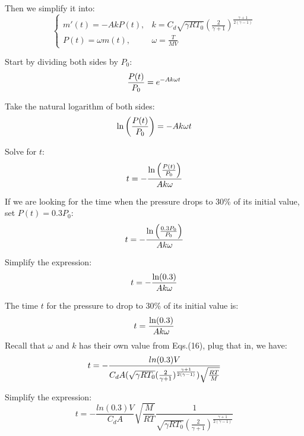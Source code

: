 Then we simplify it into:
\begin{equation}
\left\{
\begin{array}{ll}
m'(t) = -AkP(t), & \text{$k = C_d\sqrt{\gamma R T_0}\left( \frac{2}{\gamma + 1} \right)^{\frac{\gamma + 1}{2(\gamma - 1)}}$} \\
    P(t)=\omega m(t), & \text{$\omega=\frac{T}{MV}$}
\end{array}
\right.
\end{equation}

Start by dividing both sides by \( P_0 \):
\begin{equation}\notag
    \frac{P(t)}{P_0} = e^{-A k \omega t}
\end{equation}

Take the natural logarithm of both sides:
\begin{equation}\notag
    \ln \left(\frac{P(t)}{P_0}\right) = -A k \omega t
\end{equation}

Solve for \( t \):
\begin{equation}\notag
    t = -\frac{\ln \left(\frac{P(t)}{P_0}\right)}{A k \omega}
\end{equation}

If we are looking for the time when the pressure drops to 30\% of its initial value, set \( P(t) = 0.3 P_0 \):
\begin{equation}\notag
    t = -\frac{\ln \left(\frac{0.3 P_0}{P_0}\right)}{A k \omega}
\end{equation}

Simplify the expression:
\begin{equation}\notag
    t = -\frac{\ln(0.3)}{A k \omega}
\end{equation}

The time \( t \) for the pressure to drop to 30\% of its initial value is:
\begin{equation}\notag
    t = \frac{\ln(0.3)}{A k \omega}
\end{equation}
Recall that $\omega$ and $k$ has their own value from Eqs.(16), plug that in, we have:
\begin{equation}\notag
    t=-\frac{ln(0.3)V}{C_d A (\sqrt{\gamma R T_0}(\frac{2}{\gamma+1})^\frac{\gamma+1}{2(\gamma-1)})\sqrt{\frac{RT}{M}}}
\end{equation}

Simplify the expression:
\begin{equation}
    t=-\frac{ln(0.3)V}{C_d A} \sqrt{\frac{M}{RT}} \frac{1}{\sqrt{\gamma R T_0}(\frac{2}{\gamma+1})^\frac{\gamma+1}{2(\gamma-1)}}
\end{equation}


